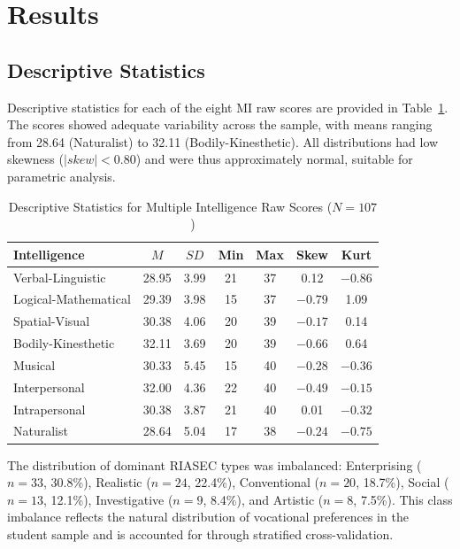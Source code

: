 \documentclass[12pt, a4paper]{article}
\begin{document}
\section{Results}

\subsection{Descriptive Statistics}

Descriptive statistics for each of the eight MI raw scores are provided in Table~\ref{tab:mi_stats}. The scores showed adequate variability across the sample, with means ranging from 28.64 (Naturalist) to 32.11 (Bodily-Kinesthetic). All distributions had low skewness ($|skew| < 0.80$) and were thus approximately normal, suitable for parametric analysis.

\begin{table}[htpb]
\centering
\caption{Descriptive Statistics for Multiple Intelligence Raw Scores ($N = 107$)}
\label{tab:mi_stats}
\small
\begin{tabular}{lcccccc}
\toprule
Intelligence & $M$ & $SD$ & Min & Max & Skew & Kurt \\
\midrule
Verbal-Linguistic     & 28.95 & 3.99 & 21 & 37 & 0.12  & $-0.86$ \\
Logical-Mathematical  & 29.39 & 3.98 & 15 & 37 & $-0.79$ & 1.09 \\
Spatial-Visual        & 30.38 & 4.06 & 20 & 39 & $-0.17$ & 0.14 \\
Bodily-Kinesthetic    & 32.11 & 3.69 & 20 & 39 & $-0.66$ & 0.64 \\
Musical               & 30.33 & 5.45 & 15 & 40 & $-0.28$ & $-0.36$ \\
Interpersonal         & 32.00 & 4.36 & 22 & 40 & $-0.49$ & $-0.15$ \\
Intrapersonal         & 30.38 & 3.87 & 21 & 40 & 0.01  & $-0.32$ \\
Naturalist            & 28.64 & 5.04 & 17 & 38 & $-0.24$ & $-0.75$ \\
\bottomrule
\end{tabular}
\end{table}

The distribution of dominant RIASEC types was imbalanced: Enterprising ($n = 33$, 30.8\%), Realistic ($n = 24$, 22.4\%), Conventional ($n = 20$, 18.7\%), Social ($n = 13$, 12.1\%), Investigative ($n = 9$, 8.4\%), and Artistic ($n = 8$, 7.5\%). This class imbalance reflects the natural distribution of vocational preferences in the student sample and is accounted for through stratified cross-validation.
\end{document}
